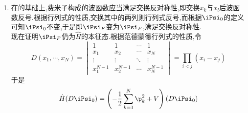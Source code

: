 \documentclass{ctexart}
\begin{document}
\begin{solution}
\begin{enumerate}[label=\tbf{(\alph*)}]
    分离变量
    \[\iPsi(q_1,\cdots,q_N)=\prod_{k=1}^{N}\psi_k(q_k)\]
    代入薛定谔方程并整理可得
    \[-\dfrac{1}{2}\dfrac{\p\psi_k}{\p q_k^2}+\dfrac12\omega_k^2q_k^2\psi_k=E_k\psi_k,\quad k=1,2,\cdots,N\]
    这是典型的谐振子模型,其基态解为
    \[\psi_{k,0}(q_k)=\left(\dfrac{\omega_k}{\pi}\right)^{1/4}\exp\left(-\dfrac{\omega_k}{2}q_k^2\right),\quad E_k=\dfrac{1}{2}\omega_k\]
    于是
    \[\iPsi_0=\prod_{k=1}^{N}\psi_k(q_k)=\dfrac{\omega_1^{1/4}\prod_{k=2}^{N}\omega_k^{1/4}}{\pi^{N/4}}\exp\left\{-\dfrac12\sum_{k=1}^{N}\omega_kq_k^2\right\}\]
    而
    \[\omega_1=1,\quad\omega_k=\sqrt{\lambda N+1}=N\theta+1,\quad k=2,\cdots,N\]
    于是
    \[C_0=\dfrac{\omega_1^{1/4}\prod_{k=2}^{N}\omega_k^{1/4}}{\pi^{N/4}}=\dfrac{(N\theta+1)^{(N-1)/4}}{\pi^{N/4}}\]
    根据前面构造的$\vec{q}_1$可得$\displaystyle q_1=\dfrac{x_1+\cdots+x_N}{\sqrt{N}}$,而
    \[\vec{q}^\t\vec{q}=\vec{x}^\t\mat{P}^\t\mat{P}\vec{x}=\vec{x}^\t\mat{I}\vec{x}=\vec{x}^\t\vec{x}\]
    于是
    \[\sum_{k=2}^{N}q_k^2=\sum_{k=1}^{N}x_k^2-q_1^2=\sum_{k=1}^{N}x_k^2-\dfrac{1}{N}\left(\sum_{k=1}^{N}x_k\right)^2=\dfrac{1}{N}\sum_{1\leq k<l\leq N}(x_k-x_l)^2\]
    于是
    \[\sum_{k=1}^{N}\omega_kq_k^2=\dfrac{1}{N}\left(\sum_{k=1}^{N}x_k\right)^2+\dfrac{\sqrt{\lambda N+1}}{N}\sum_{1\leq k<l\leq N}(x_k-x_l)^2=\sum_{k=1}^{N}x_k^2+\dfrac{\sqrt{\lambda N+1}-1}{N}\sum_{1\leq k<l\leq N}(x_k-x_l)^2\]
    于是
    \[\iPsi_0=C_0\exp\left\{-\dfrac12\sum_{k=1}^{N}\omega_kq_k^2\right\}=C_0\exp\left\{-\dfrac12\sum_{k=1}^{N}x_k^2-\dfrac{\theta}{2}\sum_{1\leq k<l\leq N}(x_k-x_l)^2\right\}\]
    基态能量则为
    \[E_0=\dfrac12\sum_{k=1}^{N}\omega_k=\dfrac{1+(N-1)(N\theta+1)}{2}\]
    证毕.
    \item 在的基础上,费米子构成的波函数应当满足交换反对称性,即交换$x_k$与$x_l$后波函数反号.根据行列式的性质,交换其中的两列则行列式反号,而根据$\iPsi_0$的定义可知$\iPsi_0$不变,于是即$\iPsi_F$变为$\iPsi_F$,满足交换反对称性.\\
    现在证明$\iPsi_F$仍为$\hat{H}$的本征态.根据范德蒙德行列式的性质,令
    \[D(x_1,\cdots,x_N)=\begin{vmatrix}
        1&1&\cdots&1\\
        x_1&x_2&\cdots&x_N\\
        \vdots&\vdots&\ddots&\vdots\\
        x_1^{N-1}&x_2^{N-1}&\cdots&x_{N}^{N-1}
    \end{vmatrix}=\prod_{i<j}(x_i-x_j)\]
    于是
    \[\begin{aligned}
        \hat{H}(D\iPsi_0)
        &=\left(-\dfrac{1}{2}\sum_{k=1}^{N}\p_k^2+V\right)(D\iPsi_0)\\

\end{aligned}\]
\end{enumerate}
\end{solution}
\end{document}
